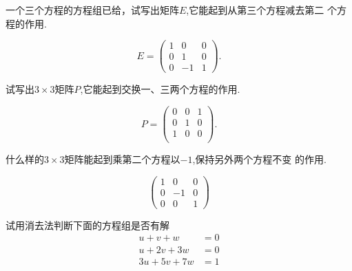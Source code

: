 ﻿\documentclass{book} \usepackage{exsheets} \usepackage{xeCJK}
\begin{document}
\begin{question}
  一个三个方程的方程组已给，试写出矩阵$E$,它能起到从第三个方程减去第二
  个方程的作用.
\end{question}
\begin{solution}
 $$ 
 E=
 \begin{pmatrix}
   1&0&0\\
   0&1&0\\
   0&-1&1
 \end{pmatrix}.
 $$
\end{solution}
\begin{question}
  试写出$3\times 3$矩阵$P$,它能起到交换一、三两个方程的作用.
\end{question}
\begin{solution}
  $$ 
  P=
  \begin{pmatrix}
    0&0&1\\
    0&1&0\\
    1&0&0\\
  \end{pmatrix}.
 $$
\end{solution}
\begin{question}
  什么样的$3\times 3$矩阵能起到乘第二个方程以$-1$,保持另外两个方程不变
  的作用.
\end{question}
\begin{solution}
 $$ 
 \begin{pmatrix}
   1&0&0\\
   0&-1&0\\
   0&0&1
 \end{pmatrix}
 $$
\end{solution}
\begin{question}
  试用消去法判断下面的方程组是否有解
  \begin{align*}
    u+v+w&=0\\
    u+2v+3w&=0\\
    3u+5v+7w&=1
  \end{align*}
\end{question}
\end{document}
